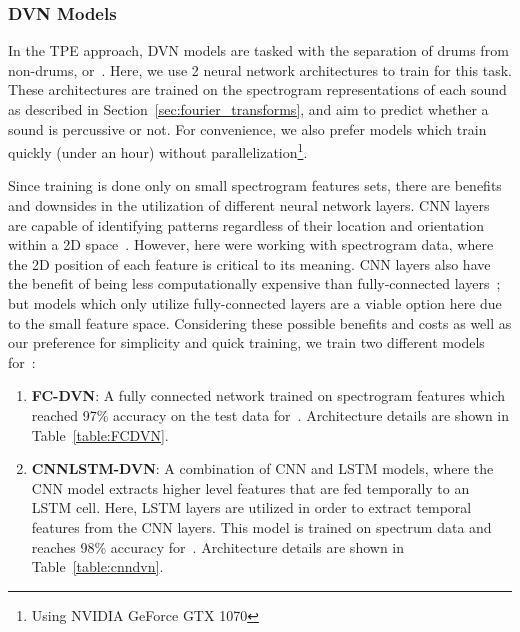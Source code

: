 \documentclass[\main/thesis.tex]{subfiles}
\begin{document}
\subsubsection{DVN Models}
\label{sec:dvn_arch}
In the TPE approach, DVN models are tasked with the separation of drums from non-drums, or~\decfirst. Here, we use 2 neural network architectures to train for this task. These architectures are trained on the spectrogram representations of each sound as described in Section~\ref{sec:fourier_transforms}, and aim to predict whether a sound is percussive or not. For convenience, we also prefer models which train quickly (under an hour) without parallelization\footnote{Using NVIDIA GeForce GTX 1070}.

Since training is done only on small spectrogram features sets, there are benefits and downsides in the utilization of different neural network layers. CNN layers are capable of identifying patterns regardless of their location and orientation within a 2D space~\cite{albawi2017understanding}. However, here were working with spectrogram data, where the 2D position of each feature is critical to its meaning. CNN layers also have the benefit of being less computationally expensive than fully-connected layers~\cite{albawi2017understanding}; but models which only utilize fully-connected layers are a viable option here due to the small feature space. Considering these possible benefits and costs as well as our preference for simplicity and quick training, we train two different models for~\decfirst:

\begin{enumerate}
\item \textbf{FC-DVN}: A fully connected network trained on spectrogram features which reached 97\% accuracy on the test data for~\decfirst. Architecture details are shown in Table~\ref{table:FCDVN}.
\item \textbf{CNNLSTM-DVN}: A combination of CNN and LSTM models, where the CNN model extracts higher level features that are fed temporally to an LSTM cell. Here, LSTM layers are utilized in order to extract temporal features from the CNN layers. This model is trained on spectrum data and reaches 98\% accuracy for~\decfirst. Architecture details are shown in Table~\ref{table:cnndvn}.
\end{enumerate}
\end{document}

